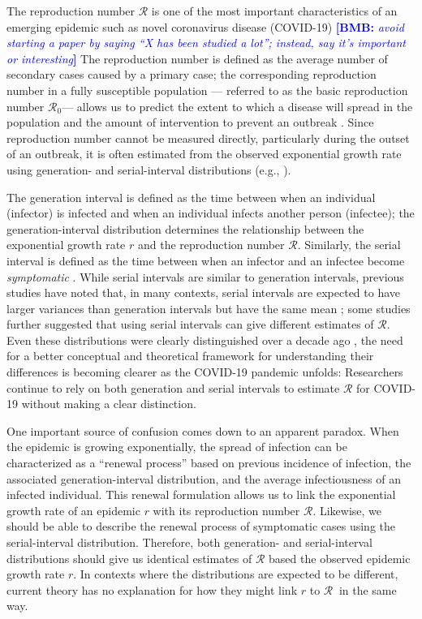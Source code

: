 \documentclass[12pt]{article}
\newcommand{\comment}{\showcomment}
\newcommand{\showcomment}[3]{\textcolor{#1}{\textbf{[#2: }\textsl{#3}\textbf{]}}}
\newcommand{\bmb}[1]{\comment{blue}{BMB}{#1}}
\newcommand{\Rx}[1]{\ensuremath{{\mathcal R}_{#1}}\xspace}
\newcommand{\Ro}{\Rx{0}}
\newcommand{\RR}{\ensuremath{{\mathcal R}}\xspace}
\begin{document}
The reproduction number \RR is one of the most important characteristics of an emerging epidemic such as novel coronavirus disease (COVID-19) \citep{majumder2020early} \bmb{avoid starting a paper by saying ``X has been studied a lot''; instead, say it's important or interesting}
The reproduction number is defined as the average number of secondary cases caused by a primary case;
the corresponding reproduction number in a fully susceptible population --- referred to as the basic reproduction number \Ro --- allows us to predict the extent to which a disease will spread in the population and the amount of intervention to prevent an outbreak \citep{anderson1991infectious}.
Since reproduction number cannot be measured directly, particularly during the outset of an outbreak, it is often estimated from the observed exponential growth rate using generation- and serial-interval distributions (e.g., \cite{du2020serial, jung2020real, li2020early, zhao2020preliminary}).

The generation interval is defined as the time between when an individual (infector) is infected and when an individual infects another person (infectee);
the generation-interval distribution determines the relationship between the exponential growth rate $r$ and the reproduction number \RR \citep{wallinga2007generation}.
Similarly, the serial interval is defined as the time between when an infector and an infectee become \emph{symptomatic} \citep{svensson2007note}.
While serial intervals are similar to generation intervals, previous studies have noted that, in many contexts, serial intervals are expected to have larger variances than generation intervals but have the same mean \citep{svensson2007note,klinkenberg2011correlation,te2013estimating,champredon2018equivalence};
some studies further suggested that using serial intervals can give different estimates of \RR \citep{britton2019estimation}.
Even these distributions were clearly distinguished over a decade ago \citep{svensson2007note}, 
the need for a better conceptual and theoretical framework for understanding their differences is becoming clearer as the COVID-19 pandemic unfolds:
Researchers continue to rely on both generation and serial intervals to estimate \RR for COVID-19 without making a clear distinction.

One important source of confusion comes down to an apparent paradox.
When the epidemic is growing exponentially, the spread of infection can be characterized as a ``renewal process'' based on previous incidence of infection, the associated generation-interval distribution, and the average infectiousness of an infected individual.
This renewal formulation allows us to link the exponential growth rate of an epidemic $r$ with its reproduction number \RR \citep{wallinga2007generation}.
Likewise, we should be able to describe the renewal process of symptomatic cases using the serial-interval distribution.
Therefore, both generation- and serial-interval distributions should give us identical estimates of  \RR based the observed epidemic growth rate $r$.
In contexts where the distributions are expected to be different, current theory has no explanation for how they might link $r$ to \Rx\ in the same way.
\end{document}
